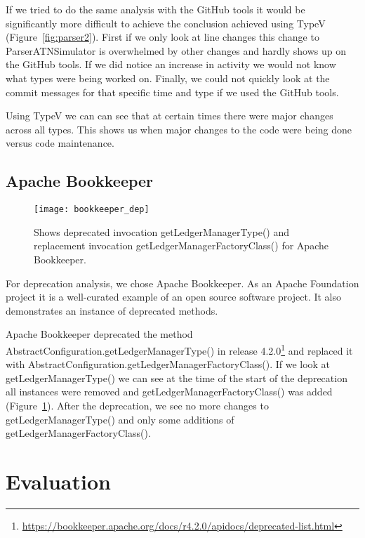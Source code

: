 If we tried to do the same analysis with the GitHub tools it would be significantly more difficult to achieve the conclusion achieved using TypeV (Figure~\ref{fig:parser2}). First if we only look at line changes this change to ParserATNSimulator is overwhelmed by other changes and hardly shows up on the GitHub tools. If we did notice an increase in activity we would not know what types were being worked on. Finally, we could not quickly look at the commit messages for that specific time and type if we used the GitHub tools.

Using TypeV we can can see that at certain times there were major changes across all types. This shows us when major changes to the code were being done versus code maintenance. 

\subsection{Apache Bookkeeper}

\begin{figure}[!ht]
\centering
\texttt{[image: bookkeeper\_dep]}
\caption{Shows deprecated invocation getLedgerManagerType() and replacement invocation getLedgerManagerFactoryClass() for Apache Bookkeeper.}
\label{fig:bookkeeper-depr}
\end{figure}

For deprecation analysis, we chose Apache Bookkeeper. As an Apache Foundation project it is a well-curated example of an open source software project. It also demonstrates an instance of deprecated methods. 

Apache Bookkeeper deprecated the method AbstractConfiguration.getLedgerManagerType() in release 4.2.0\footnote{\url{https://bookkeeper.apache.org/docs/r4.2.0/apidocs/deprecated-list.html}} and replaced it with AbstractConfiguration.getLedgerManagerFactoryClass(). If we look at getLedgerManagerType() we can see at the time of the start of the deprecation all instances were removed and getLedgerManagerFactoryClass() was added (Figure~\ref{fig:bookkeeper-depr}). After the deprecation, we see no more changes to getLedgerManagerType() and only some additions of getLedgerManagerFactoryClass().

\section{Evaluation}

